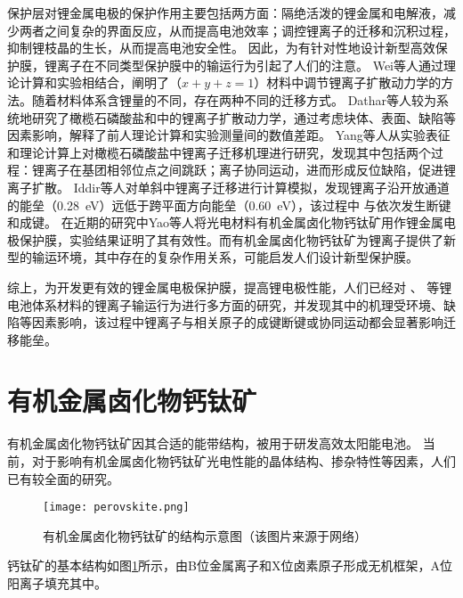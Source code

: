 保护层对锂金属电极的保护作用主要包括两方面：隔绝活泼的锂金属和电解液，减少两者之间复杂的界面反应，从而提高电池效率；调控锂离子的迁移和沉积过程，抑制锂枝晶的生长，从而提高电池安全性。
因此，为有针对性地设计新型高效保护膜，锂离子在不同类型保护膜中的输运行为引起了人们的注意。
Wei等人通过理论计算和实验相结合，阐明了（$x+y+z=1$）材料中调节锂离子扩散动力学的方法。随着材料体系含锂量的不同，存在两种不同的迁移方式。
Dathar等人较为系统地研究了橄榄石磷酸盐和中的锂离子扩散动力学，通过考虑块体、表面、缺陷等因素影响，解释了前人理论计算和实验测量间的数值差距。
Yang等人从实验表征和理论计算上对橄榄石磷酸盐中锂离子迁移机理进行研究，发现其中包括两个过程：锂离子在基团相邻位点之间跳跃；离子协同运动，进而形成反位缺陷，促进锂离子扩散。
Iddir等人对单斜中锂离子迁移进行计算模拟，发现锂离子沿开放通道的能垒（\SI{0.28} {eV}）远低于跨平面方向能垒（\SI{0.60}{eV}），该过程中  与依次发生断键和成键。
在近期的研究中Yao等人将光电材料有机金属卤化物钙钛矿用作锂金属电极保护膜，实验结果证明了其有效性。而有机金属卤化物钙钛矿为锂离子提供了新型的输运环境，其中存在的复杂作用关系，可能启发人们设计新型保护膜。

综上，为开发更有效的锂金属电极保护膜，提高锂电极性能，人们已经对  、 等锂电池体系材料的锂离子输运行为进行多方面的研究，并发现其中的机理受环境、缺陷等因素影响，该过程中锂离子与相关原子的成键断键或协同运动都会显著影响迁移能垒。

\section{有机金属卤化物钙钛矿}

有机金属卤化物钙钛矿因其合适的能带结构，被用于研发高效太阳能电池。
当前，对于影响有机金属卤化物钙钛矿光电性能的晶体结构、掺杂特性等因素，人们已有较全面的研究。

\begin{figure}[htbp]
    \centering
    \texttt{[image: perovskite.png]}
    \caption{有机金属卤化物钙钛矿的结构示意图（该图片来源于网络）}
    \label{fig:perovskite}
\end{figure}

钙钛矿的基本结构如图\ref{fig:perovskite}所示，由B位金属离子和X位卤素原子形成无机框架，A位阳离子填充其中。


